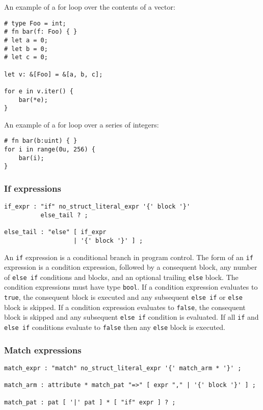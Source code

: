 \documentclass[]{article}
\begin{document}
An example of a for loop over the contents of a vector:

\begin{verbatim}
# type Foo = int;
# fn bar(f: Foo) { }
# let a = 0;
# let b = 0;
# let c = 0;

let v: &[Foo] = &[a, b, c];

for e in v.iter() {
    bar(*e);
}
\end{verbatim}

An example of a for loop over a series of integers:

\begin{verbatim}
# fn bar(b:uint) { }
for i in range(0u, 256) {
    bar(i);
}
\end{verbatim}

\subsubsection{If expressions}\label{if-expressions}

\begin{verbatim}
if_expr : "if" no_struct_literal_expr '{' block '}'
          else_tail ? ;

else_tail : "else" [ if_expr
                   | '{' block '}' ] ;
\end{verbatim}

An \texttt{if} expression is a conditional branch in program control.
The form of an \texttt{if} expression is a condition expression,
followed by a consequent block, any number of \texttt{else if}
conditions and blocks, and an optional trailing \texttt{else} block. The
condition expressions must have type \texttt{bool}. If a condition
expression evaluates to \texttt{true}, the consequent block is executed
and any subsequent \texttt{else if} or \texttt{else} block is skipped.
If a condition expression evaluates to \texttt{false}, the consequent
block is skipped and any subsequent \texttt{else if} condition is
evaluated. If all \texttt{if} and \texttt{else if} conditions evaluate
to \texttt{false} then any \texttt{else} block is executed.

\subsubsection{Match expressions}\label{match-expressions}

\begin{verbatim}
match_expr : "match" no_struct_literal_expr '{' match_arm * '}' ;

match_arm : attribute * match_pat "=>" [ expr "," | '{' block '}' ] ;

match_pat : pat [ '|' pat ] * [ "if" expr ] ? ;
\end{verbatim}
\end{document}
